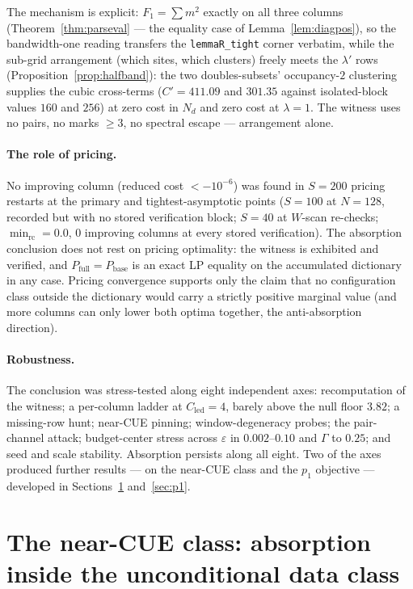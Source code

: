 \documentclass[11pt]{article}
\theoremstyle{plain}
\theoremstyle{definition}
\theoremstyle{remark}
\newcommand{\Cled}{C_{\mathrm{led}}}
\newcommand{\Nd}{N_{d}}
\begin{document}
The mechanism is explicit: $F_1 = \sum m^2$ exactly on all three columns
(Theorem~\ref{thm:parseval} --- the equality case of
Lemma~\ref{lem:diagpos}), so the bandwidth-one reading transfers the
\texttt{lemmaR\_tight} corner verbatim, while the sub-grid arrangement (which
sites, which clusters) freely meets the $\lambda'$ rows
(Proposition~\ref{prop:halfband}): the two doubles-subsets' occupancy-$2$
clustering supplies the cubic cross-terms ($C' = 411.09$ and $301.35$ against
isolated-block values $160$ and $256$) at zero cost in $\Nd$ and zero cost at
$\lambda = 1$. The witness uses no pairs, no marks $\ge 3$, no spectral escape ---
arrangement alone.

\paragraph{The role of pricing.}
No improving column (reduced cost $< -10^{-6}$) was found in $S = 200$ pricing
restarts at the primary and tightest-asymptotic points ($S = 100$ at $N = 128$,
recorded but with no stored verification block; $S = 40$ at $W$-scan
re-checks; $\min_{\mathrm{rc}} = 0.0$, $0$ improving columns at every stored
verification). The absorption conclusion does not rest on pricing optimality:
the witness is exhibited and verified, and
$P_{\mathrm{full}} = P_{\mathrm{base}}$ is an exact LP equality on the
accumulated dictionary in any case. Pricing convergence supports only the claim
that no configuration class outside the dictionary would carry a strictly
positive marginal value (and more columns can only lower both optima together,
the anti-absorption direction).

\paragraph{Robustness.}
The conclusion was stress-tested along eight independent axes: recomputation of
the witness; a per-column ladder at $\Cled = 4$, barely above the null floor
$3.82$; a missing-row hunt; near-CUE pinning; window-degeneracy probes; the
pair-channel attack; budget-center stress across $\varepsilon$ in
$0.002$--$0.10$ and $\Gamma$ to $0.25$; and seed and scale stability. Absorption
persists along all eight. Two of the axes produced further results --- on the
near-CUE class and the $p_1$ objective --- developed in
Sections~\ref{sec:nearcue} and~\ref{sec:p1}.

\section{The near-CUE class: absorption inside the unconditional data class}
\label{sec:nearcue}
\end{document}
